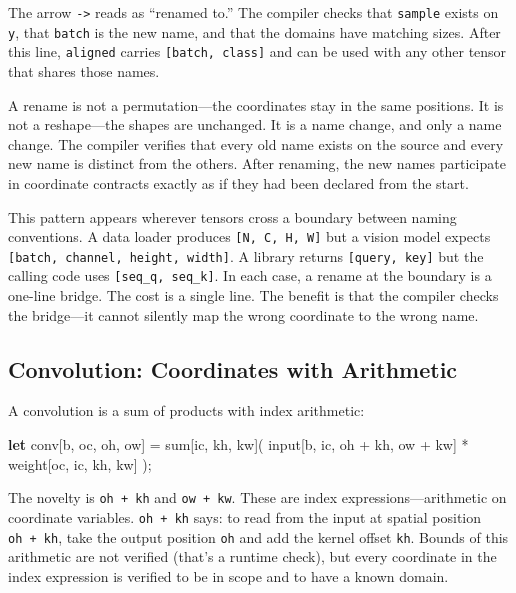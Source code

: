 \documentclass[11pt,titlepage]{article}
\newenvironment{Shaded}{}{}
\newcommand{\KeywordTok}[1]{\textcolor[rgb]{0.00,0.44,0.13}{\textbf{#1}}}
\newcommand{\NormalTok}[1]{#1}
\newcommand{\OperatorTok}[1]{\textcolor[rgb]{0.40,0.40,0.40}{#1}}
\begin{document}
The arrow \texttt{-\textgreater{}} reads as ``renamed to.'' The compiler
checks that \texttt{sample} exists on \texttt{y}, that \texttt{batch} is
the new name, and that the domains have matching sizes. After this line,
\texttt{aligned} carries \texttt{{[}batch,\ class{]}} and can be used
with any other tensor that shares those names.

A rename is not a permutation---the coordinates stay in the same
positions. It is not a reshape---the shapes are unchanged. It is a name
change, and only a name change. The compiler verifies that every old
name exists on the source and every new name is distinct from the
others. After renaming, the new names participate in coordinate
contracts exactly as if they had been declared from the start.

This pattern appears wherever tensors cross a boundary between naming
conventions. A data loader produces \texttt{{[}N,\ C,\ H,\ W{]}} but a
vision model expects \texttt{{[}batch,\ channel,\ height,\ width{]}}. A
library returns \texttt{{[}query,\ key{]}} but the calling code uses
\texttt{{[}seq\_q,\ seq\_k{]}}. In each case, a rename at the boundary
is a one-line bridge. The cost is a single line. The benefit is that the
compiler checks the bridge---it cannot silently map the wrong coordinate
to the wrong name.

\vspace{2em}

\hypertarget{convolution-coordinates-with-arithmetic}{%
\subsection{Convolution: Coordinates with
Arithmetic}\label{convolution-coordinates-with-arithmetic}}

A convolution is a sum of products with index arithmetic:

\begin{Shaded}
\begin{Highlighting}[]
\KeywordTok{let}\NormalTok{ conv}\OperatorTok{[}\NormalTok{b, oc, oh, ow}\OperatorTok{]}\NormalTok{ = sum}\OperatorTok{[}\NormalTok{ic, kh, kw}\OperatorTok{]}\NormalTok{(}
\NormalTok{    input}\OperatorTok{[}\NormalTok{b, ic, oh + kh, ow + kw}\OperatorTok{]}\NormalTok{ * weight}\OperatorTok{[}\NormalTok{oc, ic, kh, kw}\OperatorTok{]}
\NormalTok{);}
\end{Highlighting}
\end{Shaded}

The novelty is \texttt{oh\ +\ kh} and \texttt{ow\ +\ kw}. These are
index expressions---arithmetic on coordinate variables.
\texttt{oh\ +\ kh} says: to read from the input at spatial position
\texttt{oh\ +\ kh}, take the output position \texttt{oh} and add the
kernel offset \texttt{kh}. Bounds of this arithmetic are not verified
(that's a runtime check), but every coordinate in the index expression
is verified to be in scope and to have a known domain.
\end{document}
